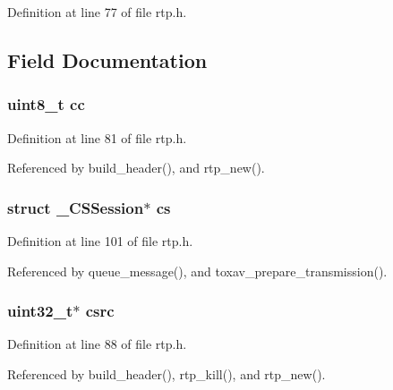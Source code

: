 Definition at line 77 of file rtp.\+h.



\subsection{Field Documentation}
\hypertarget{struct___r_t_p_session_a622e15900f3d90f1391cf9812d1a8078}{
\subsubsection[{cc}]{\setlength{\rightskip}{0pt plus 5cm}uint8\+\_\+t cc}}\label{struct___r_t_p_session_a622e15900f3d90f1391cf9812d1a8078}


Definition at line 81 of file rtp.\+h.



Referenced by build\+\_\+header(), and rtp\+\_\+new().

\hypertarget{struct___r_t_p_session_a6fa710f1d7103d0f7b2b872e33aac143}{
\subsubsection[{cs}]{\setlength{\rightskip}{0pt plus 5cm}struct {\bf \+\_\+\+C\+S\+Session}$\ast$ cs}}\label{struct___r_t_p_session_a6fa710f1d7103d0f7b2b872e33aac143}


Definition at line 101 of file rtp.\+h.



Referenced by queue\+\_\+message(), and toxav\+\_\+prepare\+\_\+transmission().

\hypertarget{struct___r_t_p_session_a8bbd14e68a057e6de8ba3fa4c6afd4fa}{
\subsubsection[{csrc}]{\setlength{\rightskip}{0pt plus 5cm}uint32\+\_\+t$\ast$ csrc}}\label{struct___r_t_p_session_a8bbd14e68a057e6de8ba3fa4c6afd4fa}


Definition at line 88 of file rtp.\+h.



Referenced by build\+\_\+header(), rtp\+\_\+kill(), and rtp\+\_\+new().

